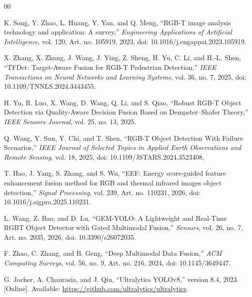 \documentclass[conference]{IEEEtran}
\begin{document}

\begin{thebibliography}{00}

K. Song, Y. Zhao, L. Huang, Y. Yan, and Q. Meng,
``RGB-T image analysis technology and application: A survey,''
\emph{Engineering Applications of Artificial Intelligence},
vol. 120, Art. no. 105919, 2023,
doi: 10.1016/j.engappai.2023.105919.

X. Zhang, X. Zhang, J. Wang, J. Ying, Z. Sheng, H. Yu,
C. Li, and H.-L. Shen,
``TFDet: Target-Aware Fusion for RGB-T Pedestrian Detection,''
\emph{IEEE Transactions on Neural Networks and Learning Systems},
vol. 36, no. 7, 2025,
doi: 10.1109/TNNLS.2024.3443455.

H. Yu, R. Luo, X. Wang, D. Wang, Q. Li, and S. Qiao,
``Robust RGB-T Object Detection via Quality-Aware Decision Fusion
Based on Dempster--Shafer Theory,''
\emph{IEEE Sensors Journal},
vol. 25, no. 13, 2025.

Q. Wang, Y. Sun, Y. Chi, and T. Shen,
``RGB-T Object Detection With Failure Scenarios,''
\emph{IEEE Journal of Selected Topics in Applied Earth Observations
and Remote Sensing},
vol. 18, 2025,
doi: 10.1109/JSTARS.2024.3523408.

T. Hao, J. Yang, S. Zhang, and S. Wu,
``EEF: Energy score-guided feature enhancement fusion method for RGB
and thermal infrared images object detection,''
\emph{Signal Processing},
vol. 239, Art. no. 110231, 2026,
doi: 10.1016/j.sigpro.2025.110231.

L. Wang, Z. Bao, and D. Lu,
``GEM-YOLO: A Lightweight and Real-Time RGBT Object Detector with
Gated Multimodal Fusion,''
\emph{Sensors},
vol. 26, no. 7, Art. no. 2035, 2026,
doi: 10.3390/s26072035.

F. Zhao, C. Zhang, and B. Geng,
``Deep Multimodal Data Fusion,''
\emph{ACM Computing Surveys},
vol. 56, no. 9, Art. no. 216, 2024,
doi: 10.1145/3649447.

G. Jocher, A. Chaurasia, and J. Qiu,
``Ultralytics YOLOv8,''
version 8.4, 2023. [Online]. Available:
\url{https://github.com/ultralytics/ultralytics}.

\end{thebibliography}

\appendices
\end{document}
